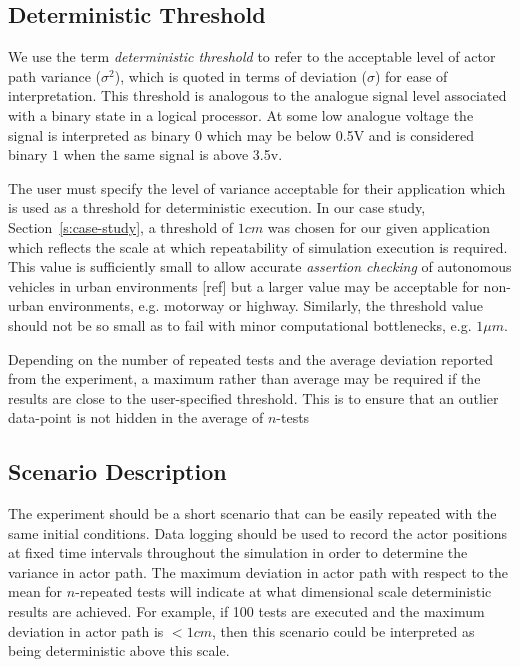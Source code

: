 \documentclass[letterpaper, 10 pt, journal, twoside]{IEEEtran}
\begin{document}
\subsection{Deterministic Threshold}
We use the term \textit{deterministic threshold} to refer to the acceptable level of actor path variance ($\sigma^2$), which is quoted in terms of deviation ($\sigma$) for ease of interpretation. This threshold is analogous to the analogue signal level associated with a binary state in a logical processor. At some low analogue voltage the signal is interpreted as binary $0$ which may be below 0.5V and is considered binary $1$ when the same signal is above 3.5v.

The user must specify the level of variance acceptable for their application which is used as a threshold for deterministic execution. In our case study, Section~\ref{s:case-study}, a threshold of $1cm$ was chosen for our given application which reflects the scale at which repeatability of simulation execution is required. This value is sufficiently small to allow accurate \textit{assertion checking} of autonomous vehicles in urban environments [ref] but a larger value may be acceptable for non-urban environments, e.g. motorway or highway. Similarly, the threshold value should not be so small as to fail with minor computational bottlenecks, e.g. $1\mu m$. 

Depending on the number of repeated tests and the average deviation reported from the experiment, a maximum rather than average may be required if the results are close to the user-specified threshold. This is to ensure that an outlier data-point is not hidden in the average of $n$-tests

\subsection{Scenario Description}
The experiment should be a short scenario that can be easily repeated with the same initial conditions. Data logging should be used to record the actor positions at fixed time intervals throughout the simulation in order to determine the variance in actor path. The maximum deviation in actor path with respect to the mean for $n$-repeated tests will indicate at what dimensional scale deterministic results are achieved. For example, if 100 tests are executed and the maximum deviation in actor path is $<1cm$, then this scenario could be interpreted as being deterministic above this scale. 
\end{document}
